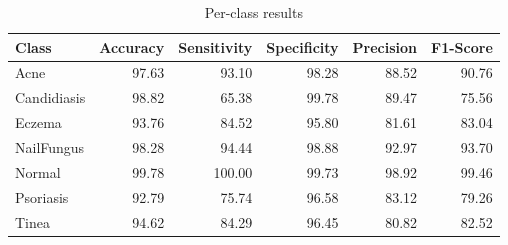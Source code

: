 \begin{table}
\caption{Per-class results}
\label{tab:results}
\begin{tabular}{lrrrrr}
\toprule
Class & Accuracy & Sensitivity & Specificity & Precision & F1-Score \\
\midrule
Acne & 97.63 & 93.10 & 98.28 & 88.52 & 90.76 \\
Candidiasis & 98.82 & 65.38 & 99.78 & 89.47 & 75.56 \\
Eczema & 93.76 & 84.52 & 95.80 & 81.61 & 83.04 \\
NailFungus & 98.28 & 94.44 & 98.88 & 92.97 & 93.70 \\
Normal & 99.78 & 100.00 & 99.73 & 98.92 & 99.46 \\
Psoriasis & 92.79 & 75.74 & 96.58 & 83.12 & 79.26 \\
Tinea & 94.62 & 84.29 & 96.45 & 80.82 & 82.52 \\
\bottomrule
\end{tabular}
\end{table}
